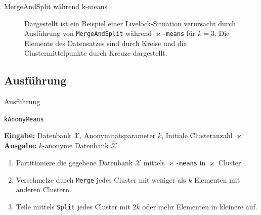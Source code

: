 \documentclass[10pt,table]{beamer}
\newcommand{\km}{\varkappa}
\newcommand{\kmeans}{$\varkappa$\texttt{-means}\xspace}
\newcommand{\kanonymeans}{\texttt{kAnonyMeans}\xspace}
\newcommand{\mergeandsplit}{\texttt{MergeAndSplit}\xspace}
\begin{document}
\begin{frame}{MergeAndSplit während k-means}
\begin{figure}[H]
{
        }
        \caption{Dargestellt ist ein Beispiel einer Livelock-Situation verursacht durch Ausführung von \mergeandsplit während \kmeans für $k=3$. Die Elemente des Datensatzes sind durch Kreise und die Clustermittelpunkte durch Kreuze dargestellt.}
        \label{fig:mergeandsplitwhilekmeans-livelock}
    \end{figure}
\end{frame}

\subsection{Ausführung}
\begin{frame}{Ausführung}
    \begin{algorithm}[H]
    \renewcommand{\thealgorithm}{}
    \caption{\kanonymeans}
    {
    \textbf{Eingabe:} Datenbank $\mathcal{X}$, Anonymitätsparameter $k$, Initiale Clusteranzahl $\km$\\
    \textbf{Ausgabe:} $k$-anonyme Datenbank $\hat{\mathcal{X}}$
    \begin{enumerate}
        \item Partitioniere die gegebene Datenbank $\mathcal{X}$ mittels \kmeans in $\km$ Cluster.
        \item Verschmelze durch \texttt{Merge} jedes Cluster mit weniger als $k$ Elementen mit anderen Clustern.
        \item Teile mittels \texttt{Split} jedes Cluster mit $2k$ oder mehr Elementen in kleinere auf.
    \end{enumerate}
    }
    \end{algorithm}
\end{frame}
\end{document}
